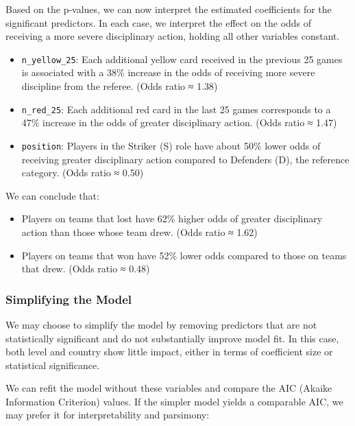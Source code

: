 \documentclass[
  letterpaper,
  DIV=11,
  numbers=noendperiod]{scrartcl}
\begin{document}
Based on the p-values, we can now interpret the estimated coefficients
for the significant predictors. In each case, we interpret the effect on
the odds of receiving a more severe disciplinary action, holding all
other variables constant.

\begin{itemize}
\item
  \texttt{n\_yellow\_25}: Each additional yellow card received in the
  previous 25 games is associated with a 38\% increase in the odds of
  receiving more severe discipline from the referee. (Odds ratio ≈ 1.38)
\item
  \texttt{n\_red\_25}: Each additional red card in the last 25 games
  corresponds to a 47\% increase in the odds of greater disciplinary
  action. (Odds ratio ≈ 1.47)
\item
  \texttt{position}: Players in the Striker (S) role have about 50\%
  lower odds of receiving greater disciplinary action compared to
  Defenders (D), the reference category. (Odds ratio ≈ 0.50)
\end{itemize}

We can conclude that:

\begin{itemize}
\item
  Players on teams that lost have 62\% higher odds of greater
  disciplinary action than those whose team drew. (Odds ratio ≈ 1.62)
\item
  Players on teams that won have 52\% lower odds compared to those on
  teams that drew. (Odds ratio ≈ 0.48)
\end{itemize}

\hypertarget{simplifying-the-model}{%
\subsubsection*{Simplifying the Model}\label{simplifying-the-model}}

We may choose to simplify the model by removing predictors that are not
statistically significant and do not substantially improve model fit. In
this case, both level and country show little impact, either in terms of
coefficient size or statistical significance.

We can refit the model without these variables and compare the AIC
(Akaike Information Criterion) values. If the simpler model yields a
comparable AIC, we may prefer it for interpretability and parsimony:
\end{document}
